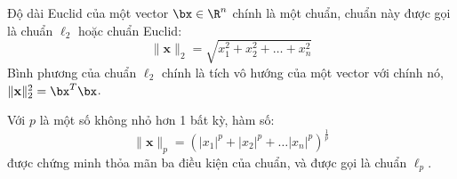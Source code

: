 
Độ dài Euclid của một vector $\bx \in \R^n$ chính là một chuẩn, chuẩn này
được gọi là chuẩn $\ell_2$ hoặc chuẩn Euclid:
\begin{equation}
    \label{eqn:norm2}
    \|\mathbf{x}\|_2 = \sqrt{x_1^2 + x_2^2 + \dots + x_n^2}
\end{equation}
Bình phương của chuẩn $\ell_2$ chính là tích vô hướng của một vector với chính nó,
$\|\mathbf{x}\|_2^2 = \bx^T\bx$.

\newpage Với $p$ {là một số không nhỏ hơn 1} bất kỳ, hàm số:
\begin{equation}
    \label{eqn:normp}
    \|\mathbf{x}\|_p = (|x_1|^p + |x_2|^p + \dots |x_n|^p)^{\frac{1}{p}}
\end{equation}
được chứng minh thỏa mãn ba điều kiện của chuẩn, và được gọi là {chuẩn $\ell_p$}.
     



